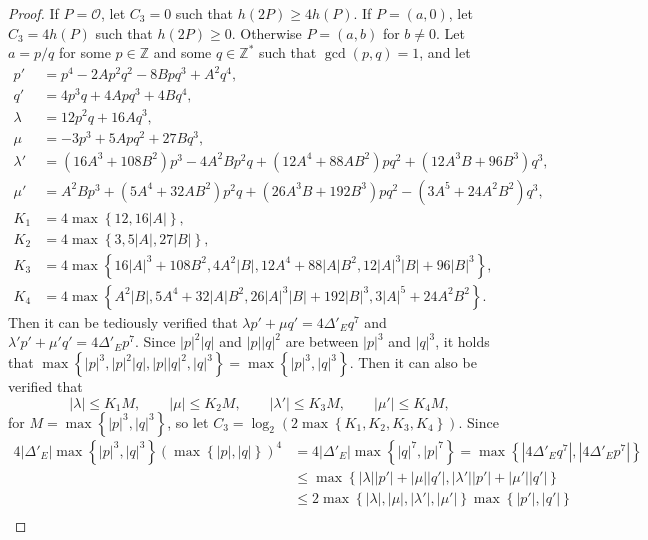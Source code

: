 \documentclass{article}
\newcommand{\Z}{\mathbb{Z}}
\newcommand{\rb}[1]{\left( #1 \right)}
\newcommand{\cb}[1]{\left\{ #1 \right\}}
\newcommand{\abs}[1]{\left\lvert #1 \right\rvert}
\theoremstyle{definition}\newtheorem*{definition}{Definition}
\theoremstyle{definition}\newtheorem*{example}{Example}
\theoremstyle{definition}\newtheorem*{remark}{Remark}
\begin{document}
\begin{proof}
If $ P = \mathcal{O} $, let $ C_3 = 0 $ such that $ h\rb{2P} \ge 4h\rb{P} $. If $ P = \rb{a, 0} $, let $ C_3 = 4h\rb{P} $ such that $ h\rb{2P} \ge 0 $. Otherwise $ P = \rb{a, b} $ for $ b \ne 0 $. Let $ a = p / q $ for some $ p \in \Z $ and some $ q \in \Z^* $ such that $ \gcd\rb{p, q} = 1 $, and let
\begin{align*}
p' & = p^4 - 2Ap^2q^2 - 8Bpq^3 + A^2q^4, \\
q' & = 4p^3q + 4Apq^3 + 4Bq^4, \\
\lambda & = 12p^2q + 16Aq^3, \\
\mu & = -3p^3 + 5Apq^2 + 27Bq^3, \\
\lambda' & = \rb{16A^3 + 108B^2}p^3 - 4A^2Bp^2q + \rb{12A^4 + 88AB^2}pq^2 + \rb{12A^3B + 96B^3}q^3, \\
\mu' & = A^2Bp^3 + \rb{5A^4 + 32AB^2}p^2q + \rb{26A^3B + 192B^3}pq^2 - \rb{3A^5 + 24A^2B^2}q^3, \\
K_1 & = 4\max\cb{12, 16\abs{A}}, \\
K_2 & = 4\max\cb{3, 5\abs{A}, 27\abs{B}}, \\
K_3 & = 4\max\cb{16\abs{A}^3 + 108B^2, 4A^2\abs{B}, 12A^4 + 88\abs{A}B^2, 12\abs{A}^3\abs{B} + 96\abs{B}^3}, \\
K_4 & = 4\max\cb{A^2\abs{B}, 5A^4 + 32\abs{A}B^2, 26\abs{A}^3\abs{B} + 192\abs{B}^3, 3\abs{A}^5 + 24A^2B^2}.
\end{align*}
Then it can be tediously verified that $ \lambda p' + \mu q' = 4\Delta'_E q^7 $ and $ \lambda' p' + \mu' q' = 4\Delta'_E p^7 $. Since $ \abs{p}^2\abs{q} $ and $ \abs{p}\abs{q}^2 $ are between $ \abs{p}^3 $ and $ \abs{q}^3 $, it holds that $ \max\cb{\abs{p}^3, \abs{p}^2\abs{q}, \abs{p}\abs{q}^2, \abs{q}^3} = \max\cb{\abs{p}^3, \abs{q}^3} $. Then it can also be verified that
$$ \abs{\lambda} \le K_1M, \qquad \abs{\mu} \le K_2M, \qquad \abs{\lambda'} \le K_3M, \qquad \abs{\mu'} \le K_4M, $$
for $ M = \max\cb{\abs{p}^3, \abs{q}^3} $, so let $ C_3 = \log_2\rb{2\max\cb{K_1, K_2, K_3, K_4}} $. Since
\begin{align*}
4\abs{\Delta'_E}\max\cb{\abs{p}^3, \abs{q}^3}\rb{\max\cb{\abs{p}, \abs{q}}}^4
& = 4\abs{\Delta'_E}\max\cb{\abs{q}^7, \abs{p}^7}
= \max\cb{\abs{4\Delta'_E q^7}, \abs{4\Delta'_E p^7}} \\
& \le \max\cb{\abs{\lambda}\abs{p'} + \abs{\mu}\abs{q'}, \abs{\lambda'}\abs{p'} + \abs{\mu'}\abs{q'}} \\
& \le 2\max\cb{\abs{\lambda}, \abs{\mu}, \abs{\lambda'}, \abs{\mu'}}\max\cb{\abs{p'}, \abs{q'}} \\

\end{align*}
\end{proof}
\end{document}

